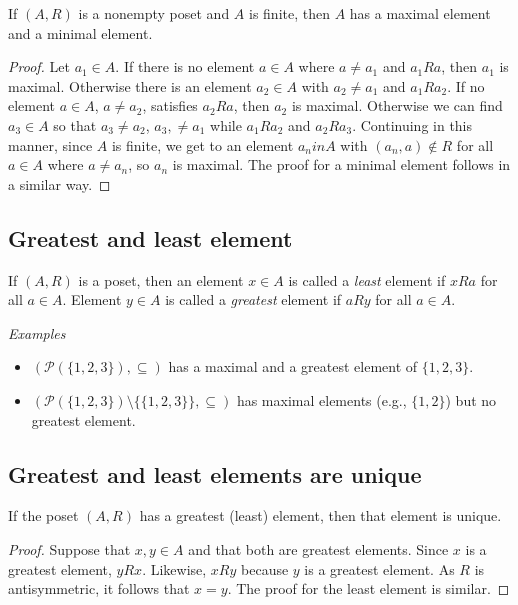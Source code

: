 \documentclass[11pt]{article}
\begin{document}
    If \((A,R)\) is a nonempty poset and $A$ is finite, then $A$ has a maximal element and a minimal element.
    \begin{proof}
        Let \(a_1 \in A\). If there is no element \(a \in A\) where \(a \neq a_1\) and \(a_1 R a\), then \(a_1\) is maximal. Otherwise there is an element \(a_2 \in A\) with \(a_2 \neq a_1\) and \(a_1 R a_2\). If no element \(a \in A\), \(a \neq a_2\), satisfies \(a_2 R a\), then \(a_2\) is maximal. Otherwise we can find \(a_3 \in A\) so that \(a_3 \neq a_2\), \(a_3, \neq a_1\) while \(a_1 R a_2\) and \(a_2 R a_3\). Continuing in this manner, since $A$ is finite, we get to an element \(a_n in A\) with \((a_n, a) \notin R\) for all \(a \in A\) where \(a \neq a_n\), so \(a_n\) is maximal. The proof for a minimal element follows in a similar way.
    \end{proof}

    \subsection{Greatest and least element}

    If \((A,R)\) is a poset, then an element \(x \in A\) is called a \emph{least} element if \(x R a\) for all \(a \in A\). Element \(y \in A\) is called a \emph{greatest} element if \(aRy\) for all \(a \in A\).

    \vspace{1em}

    \emph{Examples}
    \begin{itemize}
        \item \((\mathcal{P}(\{1,2,3\}),\subseteq)\) has a maximal and a greatest element of \(\{1,2,3\}\).
        \item \((\mathcal{P}(\{1,2,3\}) \setminus \{\{1,2,3\}\}, \subseteq)\) has maximal elements (e.g., \(\{1,2\}\)) but no greatest element.
    \end{itemize}

    \subsection{Greatest and least elements are unique}

    If the poset \((A,R)\) has a greatest (least) element, then that element is unique.
    \begin{proof}
        Suppose that \(x,y \in A\) and that both are greatest elements. Since $x$ is a greatest element, \(yRx\). Likewise, \(xRy\) because $y$ is a greatest element. As $R$ is antisymmetric, it follows that \(x=y\). The proof for the least element is similar.
    \end{proof}
\end{document}
